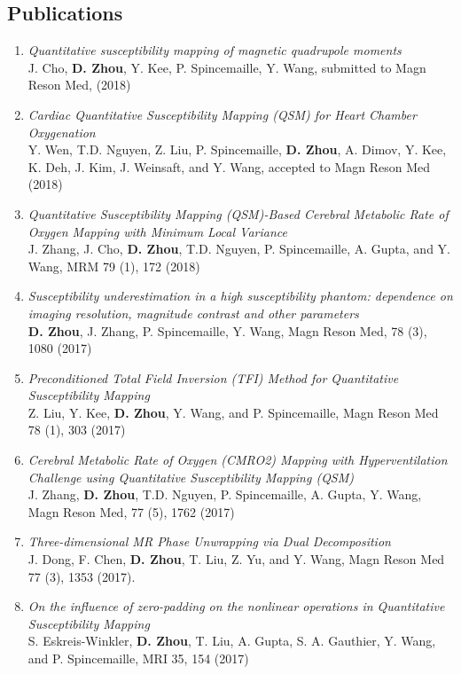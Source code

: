 \documentclass[centered,11pt,overlapped]{res}
\begin{document}
\begin{resume}
{\section{\sc Publications}
\begin{enumerate}[leftmargin=-0.1in]
\item {\em Quantitative susceptibility mapping of magnetic quadrupole moments}\\
J. Cho, {\bf D. Zhou}, Y. Kee, P. Spincemaille, Y. Wang, submitted to Magn Reson Med, (2018)
\item{\em Cardiac Quantitative Susceptibility Mapping (QSM) for Heart Chamber Oxygenation}\\
Y. Wen, T.D. Nguyen, Z. Liu, P. Spincemaille, {\bf D. Zhou}, A. Dimov, Y. Kee, K. Deh, J. Kim, J. Weinsaft, and Y. Wang, accepted to Magn Reson Med (2018)
\item {\em Quantitative Susceptibility Mapping (QSM)-Based Cerebral Metabolic Rate of Oxygen Mapping with Minimum Local Variance }\\
J. Zhang, J. Cho, {\bf D. Zhou}, T.D. Nguyen, P. Spincemaille, A. Gupta, and Y. Wang, MRM 79 (1), 172 (2018)
\item {\em Susceptibility underestimation in a high susceptibility phantom: dependence on imaging resolution, magnitude contrast and other parameters}\\
{\bf D. Zhou}, J. Zhang, P. Spincemaille, Y. Wang, Magn Reson Med, 78 (3), 1080 (2017)
\item {\em Preconditioned Total Field Inversion (TFI) Method for Quantitative Susceptibility Mapping} \\
Z. Liu, Y. Kee, {\bf D. Zhou}, Y. Wang, and P. Spincemaille, Magn Reson Med 78 (1), 303 (2017)
\item {\em Cerebral Metabolic Rate of Oxygen (CMRO2) Mapping with Hyperventilation Challenge using Quantitative Susceptibility Mapping (QSM)}\\
J. Zhang, {\bf D. Zhou}, T.D. Nguyen, P. Spincemaille, A. Gupta, Y. Wang, Magn Reson Med, 77 (5), 1762 (2017)
\item {\em Three-dimensional MR Phase Unwrapping via Dual Decomposition} \\
J. Dong, F. Chen,  {\bf D. Zhou}, T. Liu, Z. Yu, and Y. Wang, Magn Reson Med 77 (3), 1353 (2017).
\item {\em On the influence of zero-padding on the nonlinear operations in Quantitative Susceptibility Mapping}\\
S. Eskreis-Winkler, {\bf D. Zhou}, T. Liu, A. Gupta, S. A. Gauthier, Y. Wang, and P. Spincemaille, MRI 35, 154 (2017)

\end{enumerate}}
\end{resume}
\end{document}
